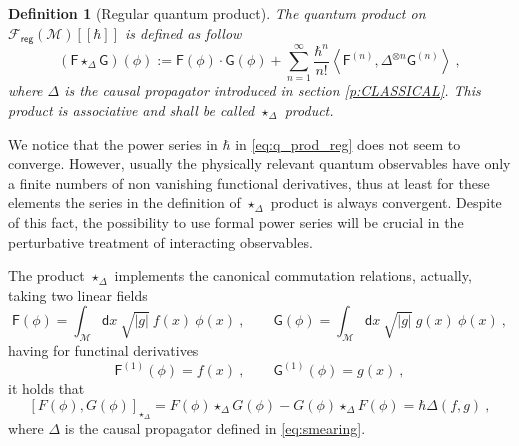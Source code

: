 \documentclass[11pt]{book}
\newcommand{\reg}{\mathsf{reg}}
\newcommand{\abs}[1]{\left|#1\right|}
\newcommand{\sm}[1]{\left\langle#1\right\rangle}
\newcommand{\Fcal}{\mathcal{F}}
\newcommand{\Mcal}{\mathcal{M}}
\newcommand{\Fsf}{\mathsf{F}}
\newcommand{\Gsf}{\mathsf{G}}
\newcommand{\dsf}{\mathsf{d}}
\theoremstyle{break}
\newtheorem{definition}{Definition}[chapter]
\begin{document}
\begin{definition}[Regular quantum product]
The quantum product on $\Fcal_\reg(\Mcal)[[\hbar]]$ is defined as follow
%
\begin{equation}
(\Fsf \star_\Delta \Gsf)(\phi) := \Fsf(\phi) \cdot \Gsf(\phi) + \sum_{n=1}^\infty \frac{\hbar^n}{n!} \sm{ \Fsf^{(n)} , \Delta^{\otimes n} \Gsf^{(n) } } \ ,
\label{eq:q_prod_reg}
\end{equation}
%
where $\Delta$ is the causal propagator introduced in section \ref{p:CLASSICAL}. This product is associative and shall be called $\star_\Delta$ product.
\end{definition}


We notice that the power series in $\hbar$ in \eqref{eq:q_prod_reg} does not seem to converge. However, usually the physically relevant quantum observables have only a finite numbers of non vanishing functional derivatives, thus at least for these elements the series in the definition of $\star_\Delta$ product is always convergent. Despite of this fact, the possibility to use formal power series will be crucial in the perturbative treatment of interacting observables.


\bigskip


The product $\star_\Delta$ implements the canonical commutation relations, actually, taking two linear fields 
%
\begin{equation*}
\Fsf(\phi) = \int_\Mcal \dsf x \ \sqrt{\abs{g}} \ f(x) \ \phi(x) \ , \qquad \Gsf(\phi) = \int_\Mcal \dsf x \ \sqrt{\abs{g}} \ g(x) \ \phi(x) \ ,
\end{equation*}
%
having for functinal derivatives
%
\begin{equation*}
\Fsf^{(1)}(\phi) = f(x) \ , \qquad \Gsf^{(1)}(\phi) = g(x) \ ,
\end{equation*}
%
it holds that 
%
\begin{equation*}
\left[F(\phi),G(\phi)\right]_{\star_\Delta} =  F(\phi) \star_\Delta G(\phi) - G(\phi) \star_\Delta F(\phi) =  \hbar \Delta(f,g) \ ,
\end{equation*}
%
where $\Delta$ is the causal propagator defined in \eqref{eq:smearing}.


\bigskip
\end{document}
